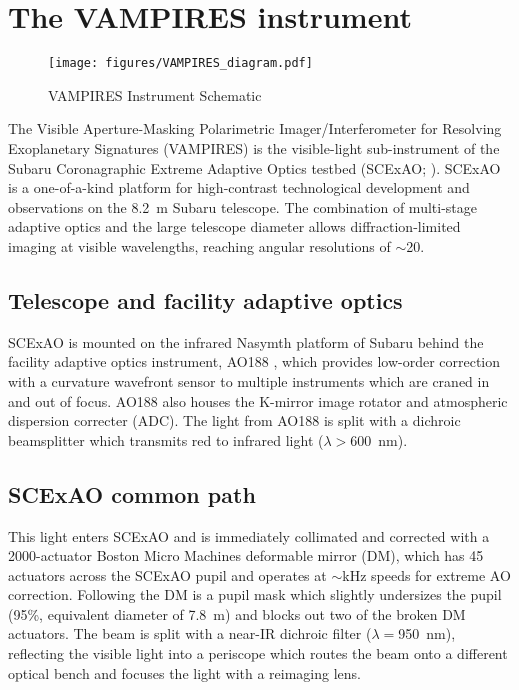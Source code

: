 \section{The VAMPIRES instrument}\label{sec:design}

\begin{figure*}[t]
    \centering
    \texttt{[image: figures/VAMPIRES\_diagram.pdf]}
    \caption{VAMPIRES Instrument Schematic}
    \label{fig:schematic}
\end{figure*}

The Visible Aperture-Masking Polarimetric Imager/Interferometer for Resolving Exoplanetary Signatures (VAMPIRES) is the visible-light sub-instrument of the Subaru Coronagraphic Extreme Adaptive Optics testbed (SCExAO; \citet{jovanovic_subaru_2015}). SCExAO is a one-of-a-kind platform for high-contrast technological development and observations on the \SI{8.2}{\meter} Subaru telescope. The combination of multi-stage adaptive optics and the large telescope diameter allows diffraction-limited imaging at visible wavelengths, reaching angular resolutions of $\sim$\SI{20}{\mas}. 


\subsection{Telescope and facility adaptive optics}
SCExAO is mounted on the infrared Nasymth platform of Subaru behind the facility adaptive optics instrument, AO188 \citep{minowa_performance_2010}, which provides low-order correction with a curvature wavefront sensor to multiple instruments which are craned in and out of focus. AO188 also houses the K-mirror image rotator and atmospheric dispersion correcter (ADC). The light from AO188 is split with a dichroic beamsplitter which transmits red to infrared light ($\lambda >$\SI{600}{\nano\meter}). 

\subsection{SCExAO common path}
This light enters SCExAO and is immediately collimated and corrected with a 2000-actuator Boston Micro Machines deformable mirror (DM), which has 45 actuators across the SCExAO pupil and operates at $\sim$\si{\kilo\hertz} speeds for extreme AO correction. Following the DM is a pupil mask which slightly undersizes the pupil (95\%, equivalent diameter of \SI{7.8}{\meter}) and blocks out two of the broken DM actuators. The beam is split with a near-IR dichroic filter ($\lambda=$\SI{950}{\nano\meter}), reflecting the visible light into a periscope which routes the beam onto a different optical bench and focuses the light with a reimaging lens.

